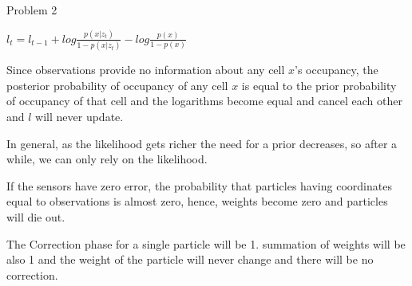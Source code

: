 \documentclass{article}
\begin{document}
\begin{problem}{Problem 2}
\begin{problem}{2.1}

$l_t = l_{t-1} + log\frac{p(x|z_t)}{1-p(x|z_t)} - log\frac{p(x)}{1-p(x)}$

Since observations provide no information about any cell $x$'s occupancy, the posterior probability of occupancy of any cell $x$ is equal to the prior probability of occupancy of that cell and the logarithms become equal and cancel each other and $l$ will never update.

\end{problem}
\begin{problem}{2.2}
In general, as the likelihood gets richer the need for a prior decreases, so after a while, we can only rely on the likelihood.
\end{problem}
\begin{problem}{2.3}
If the sensors have zero error, the probability that particles having coordinates equal to observations is almost zero, hence, weights become zero and particles will die out.
\end{problem}
\begin{problem}{2.4}
The Correction phase for a single particle will be 1. summation of weights will be also 1 and the weight of the particle will never change and there will be no correction.
\end{problem}
\end{problem}
\end{document}
